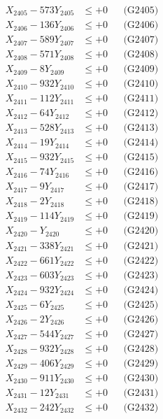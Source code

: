 \documentclass[a4paper,10pt]{article}
\begin{document}
{\begin{align}
X_{2405} - 573Y_{2405} &\leq +0 && \text{(G2405)} \\
X_{2406} - 136Y_{2406} &\leq +0 && \text{(G2406)} \\
X_{2407} - 589Y_{2407} &\leq +0 && \text{(G2407)} \\
X_{2408} - 571Y_{2408} &\leq +0 && \text{(G2408)} \\
X_{2409} - 8Y_{2409} &\leq +0 && \text{(G2409)} \\
X_{2410} - 932Y_{2410} &\leq +0 && \text{(G2410)} \\
\allowbreak
X_{2411} - 112Y_{2411} &\leq +0 && \text{(G2411)} \\
X_{2412} - 64Y_{2412} &\leq +0 && \text{(G2412)} \\
X_{2413} - 528Y_{2413} &\leq +0 && \text{(G2413)} \\
X_{2414} - 19Y_{2414} &\leq +0 && \text{(G2414)} \\
X_{2415} - 932Y_{2415} &\leq +0 && \text{(G2415)} \\
X_{2416} - 74Y_{2416} &\leq +0 && \text{(G2416)} \\
X_{2417} - 9Y_{2417} &\leq +0 && \text{(G2417)} \\
X_{2418} - 2Y_{2418} &\leq +0 && \text{(G2418)} \\
X_{2419} - 114Y_{2419} &\leq +0 && \text{(G2419)} \\
X_{2420} - Y_{2420} &\leq +0 && \text{(G2420)} \\
\allowbreak
X_{2421} - 338Y_{2421} &\leq +0 && \text{(G2421)} \\
X_{2422} - 661Y_{2422} &\leq +0 && \text{(G2422)} \\
X_{2423} - 603Y_{2423} &\leq +0 && \text{(G2423)} \\
X_{2424} - 932Y_{2424} &\leq +0 && \text{(G2424)} \\
X_{2425} - 6Y_{2425} &\leq +0 && \text{(G2425)} \\
X_{2426} - 2Y_{2426} &\leq +0 && \text{(G2426)} \\
X_{2427} - 544Y_{2427} &\leq +0 && \text{(G2427)} \\
X_{2428} - 932Y_{2428} &\leq +0 && \text{(G2428)} \\
X_{2429} - 406Y_{2429} &\leq +0 && \text{(G2429)} \\
X_{2430} - 911Y_{2430} &\leq +0 && \text{(G2430)} \\
\allowbreak
X_{2431} - 12Y_{2431} &\leq +0 && \text{(G2431)} \\
X_{2432} - 242Y_{2432} &\leq +0 && \text{(G2432)} \\

\end{align}}
\end{document}
